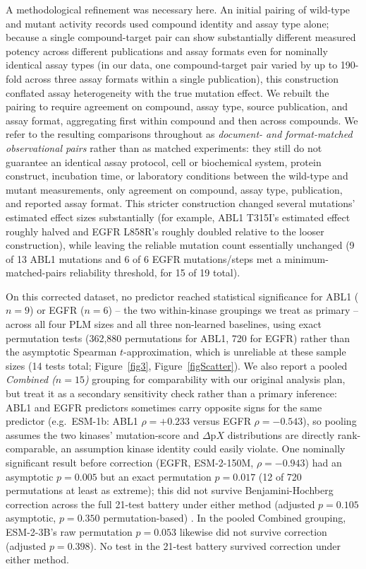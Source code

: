 \documentclass[pdflatex,sn-mathphys-num]{sn-jnl}%
\theoremstyle{thmstyleone}%
\theoremstyle{thmstyletwo}%
\theoremstyle{thmstylethree}%
\begin{document}
A methodological refinement was necessary here. An initial pairing of wild-type and mutant activity records used compound identity and assay type alone; because a single compound-target pair can show substantially different measured potency across different publications and assay formats even for nominally identical assay types (in our data, one compound-target pair varied by up to 190-fold across three assay formats within a single publication), this construction conflated assay heterogeneity with the true mutation effect. We rebuilt the pairing to require agreement on compound, assay type, source publication, and assay format, aggregating first within compound and then across compounds. We refer to the resulting comparisons throughout as \emph{document- and format-matched observational pairs} rather than as matched experiments: they still do not guarantee an identical assay protocol, cell or biochemical system, protein construct, incubation time, or laboratory conditions between the wild-type and mutant measurements, only agreement on compound, assay type, publication, and reported assay format. This stricter construction changed several mutations' estimated effect sizes substantially (for example, ABL1 T315I's estimated effect roughly halved and EGFR L858R's roughly doubled relative to the looser construction), while leaving the reliable mutation count essentially unchanged (9 of 13 ABL1 mutations and 6 of 6 EGFR mutations/steps met a minimum-matched-pairs reliability threshold, for 15 of 19 total).

On this corrected dataset, no predictor reached statistical significance for ABL1 ($n=9$) or EGFR ($n=6$) -- the two within-kinase groupings we treat as primary -- across all four PLM sizes and all three non-learned baselines, using exact permutation tests (362{,}880 permutations for ABL1, 720 for EGFR) rather than the asymptotic Spearman $t$-approximation, which is unreliable at these sample sizes (14 tests total; Figure~\ref{fig3}, Figure~\ref{figScatter}). We also report a pooled \emph{Combined ($n=15$)} grouping for comparability with our original analysis plan, but treat it as a secondary sensitivity check rather than a primary inference: ABL1 and EGFR predictors sometimes carry opposite signs for the same predictor (e.g.\ ESM-1b: ABL1 $\rho=+0.233$ versus EGFR $\rho=-0.543$), so pooling assumes the two kinases' mutation-score and $\Delta\mathrm{p}X$ distributions are directly rank-comparable, an assumption kinase identity could easily violate. One nominally significant result before correction (EGFR, ESM-2-150M, $\rho = -0.943$) had an asymptotic $p=0.005$ but an exact permutation $p=0.017$ (12 of 720 permutations at least as extreme); this did not survive Benjamini-Hochberg correction across the full 21-test battery under either method (adjusted $p=0.105$ asymptotic, $p=0.350$ permutation-based) \citep{BenjaminiHochberg1995}. In the pooled Combined grouping, ESM-2-3B's raw permutation $p=0.053$ likewise did not survive correction (adjusted $p=0.398$). No test in the 21-test battery survived correction under either method.
\end{document}
